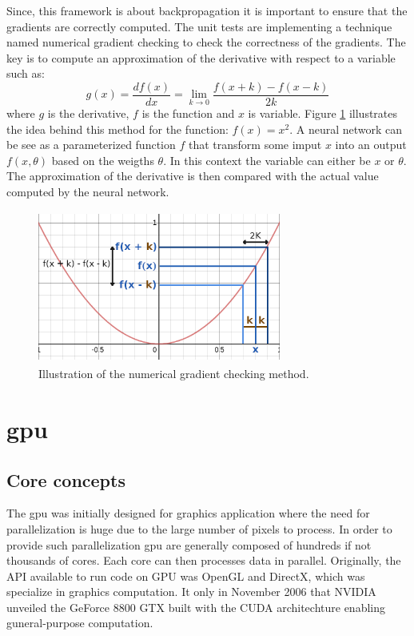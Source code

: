 \documentclass[11pt]{report}
\begin{document}
\noindent Since, this framework is about backpropagation it is important to ensure that the gradients are correctly computed. The unit tests are implementing a technique named numerical gradient checking to check the correctness of the gradients. The key is to compute an approximation of the derivative with respect to a variable such as:
\begin{equation}
g(x) = \frac{df(x)}{dx} = \lim_{k\to0} \frac{f(x + k) - f(x - k)}{2k}
\end{equation}
where $g$ is the derivative, $f$ is the function and $x$ is variable.
Figure \ref{fig:gradient_checking} illustrates the idea behind this method for the function: $f(x) = x^{2}$. A neural network can be see as a parameterized function $f$ that transform some imput $x$ into an output $f(x, \theta)$ based on the weigths $\theta$. In this context the variable can either be $x$ or $\theta$. The approximation of the derivative is then compared with the actual value computed by the neural network.

\begin{figure}[h]
\centering
\includegraphics[width=8cm, height=5cm]{gradient_checking}
\caption[Illustration of the numerical gradient checking method]{Illustration of the numerical gradient checking method.}
\label{fig:gradient_checking}
\end{figure}

\section{\acrlong{gpu}}

\subsection{Core concepts} \label{sec:core_concepts}

The \acrshort{gpu} was initially designed for graphics application where the need for parallelization is huge due to the large number of pixels to process. In order to provide such parallelization \acrshort{gpu} are generally composed of hundreds if not thousands of cores. Each core can then processes data in parallel. Originally, the API available to run code on GPU was OpenGL and DirectX, which was specialize in graphics computation. It only in November 2006 that NVIDIA unveiled the GeForce 8800 GTX built with the CUDA architechture enabling guneral-purpose computation.
\\
\end{document}
